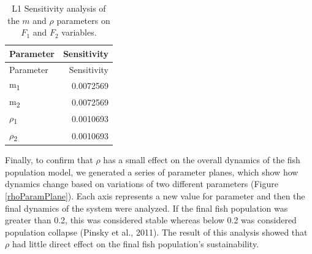 \documentclass[
]{article}
\begin{document}
\begin{longtable}[]{@{}lr@{}}
\caption{\label{tab:Sensitivty}L1 Sensitivity analysis of the \(m\) and \(\rho\) parameters on \(F_1\) and \(F_2\) variables. \label{Sensitivity}}\tabularnewline
\toprule()
Parameter & Sensitivity \\
\midrule()
\endfirsthead
\toprule()
Parameter & Sensitivity \\
\midrule()
\endhead
m\textsubscript{1} & 0.0072569 \\
m\textsubscript{2} & 0.0072569 \\
\(\rho\)\textsubscript{1} & 0.0010693 \\
\(\rho\)\textsubscript{2} & 0.0010693 \\
\bottomrule()
\end{longtable}

Finally, to confirm that \(\rho\) has a small effect on the overall dynamics of the fish population model, we generated a series of parameter planes, which show how dynamics change based on variations of two different parameters (Figure \ref{rhoParamPlane}). Each axis represents a new value for parameter and then the final dynamics of the system were analyzed. If the final fish population was greater than 0.2, this was considered stable whereas below 0.2 was considered population collapse (Pinsky et al., 2011). The result of this analysis showed that \(\rho\) had little direct effect on the final fish population's sustainability.
\end{document}
